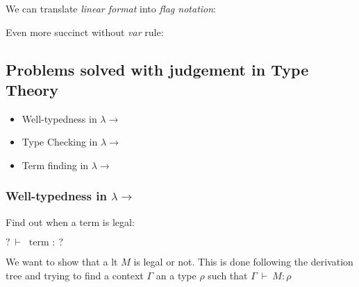 \documentclass[12pt, a4paper]{article}
\newcommand{\deriv}{\ \vdash\ }
\begin{document}
We can translate \textit{linear format} into \textit{flag notation}:

\begin{flagderiv}
  \end{flagderiv}

Even more succinct without \textit{var} rule:

\begin{flagderiv}
  \end{flagderiv}

\subsection{Problems solved with judgement in Type Theory}

\begin{itemize}
    \item Well-typedness in $\lambda\to$
    \item Type Checking in $\lambda\to$
    \item Term finding in $\lambda\to$
\end{itemize}

\subsubsection{Well-typedness in \texorpdfstring{$\lambda\to$}{Lg}}
Find out when a term is legal: 

$ ? \deriv \text{ term } :\ ?$ 

We want to show that a \acrshort{lt} $M$ is legal or not. This is done following the derivation tree and 
trying to find a context $\Gamma$ an a type $\rho$ such that $\Gamma \deriv M : \rho$
\end{document}
